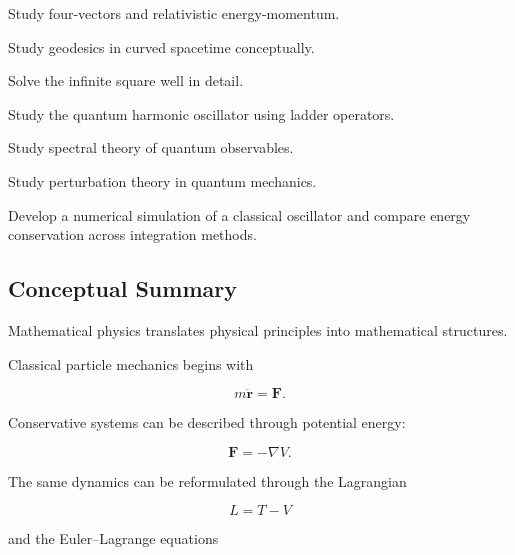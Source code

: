 \begin{exercise}[4]
Study four-vectors and relativistic energy-momentum.
\end{exercise}

\begin{exercise}[4]
Study geodesics in curved spacetime conceptually.
\end{exercise}

\begin{exercise}[4]
Solve the infinite square well in detail.
\end{exercise}

\begin{exercise}[4]
Study the quantum harmonic oscillator using ladder operators.
\end{exercise}

\begin{exercise}[4]
Study spectral theory of quantum observables.
\end{exercise}

\begin{exercise}[4]
Study perturbation theory in quantum mechanics.
\end{exercise}

\begin{exercise}[4]
Develop a numerical simulation of a classical oscillator and compare
energy conservation across integration methods.
\end{exercise}

\subsection{Conceptual Summary}
\label{subsec:mathematical-physics-summary}

Mathematical physics translates physical principles into mathematical
structures.

Classical particle mechanics begins with

\[
\boxed{
m\ddot{\mathbf{r}}
=
\mathbf{F}.
}
\]

Conservative systems can be described through potential energy:

\[
\boxed{
\mathbf{F}
=
-\nabla V.
}
\]

The same dynamics can be reformulated through the Lagrangian

\[
\boxed{
L=T-V
}
\]

and the Euler--Lagrange equations


